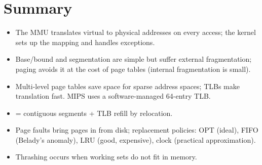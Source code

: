 \section*{Summary}
\begin{itemize}
  \item The MMU translates virtual to physical addresses on every access; the kernel sets up
    the mapping and handles exceptions.
  \item Base/bound and segmentation are simple but suffer external fragmentation; paging avoids
    it at the cost of page tables (internal fragmentation is small).
  \item Multi-level page tables save space for sparse address spaces; TLBs make translation
    fast. MIPS uses a software-managed 64-entry TLB.
  \item {} = contiguous segments + TLB refill by relocation.
  \item Page faults bring pages in from disk; replacement policies: OPT (ideal), FIFO
    (Belady's anomaly), LRU (good, expensive), clock (practical approximation).
  \item Thrashing occurs when working sets do not fit in memory.
\end{itemize}
